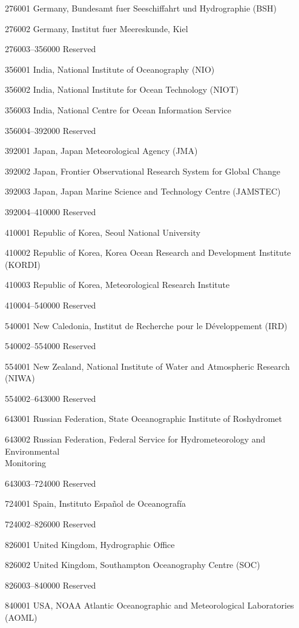 276001 Germany, Bundesamt fuer Seeschiffahrt und Hydrographie (BSH)

276002 Germany, Institut fuer Meereskunde, Kiel

276003--356000 Reserved

356001 India, National Institute of Oceanography (NIO)

356002 India, National Institute for Ocean Technology (NIOT)

356003 India, National Centre for Ocean Information Service

356004--392000 Reserved

392001 Japan, Japan Meteorological Agency (JMA)

392002 Japan, Frontier Observational Research System for Global Change

392003 Japan, Japan Marine Science and Technology Centre (JAMSTEC)

392004--410000 Reserved

410001 Republic of Korea, Seoul National University

410002 Republic of Korea, Korea Ocean Research and Development Institute (KORDI)

410003 Republic of Korea, Meteorological Research Institute

410004--540000 Reserved

540001 New Caledonia, Institut de Recherche pour le Développement (IRD)

540002--554000 Reserved

554001 New Zealand, National Institute of Water and Atmospheric Research (NIWA)

554002--643000 Reserved

643001 Russian Federation, State Oceanographic Institute of Roshydromet

643002 Russian Federation, Federal Service for Hydrometeorology and Environmental\\
Monitoring

643003--724000 Reserved

724001 Spain, Instituto Español de Oceanografía

724002--826000 Reserved

826001 United Kingdom, Hydrographic Office

826002 United Kingdom, Southampton Oceanography Centre (SOC)

826003--840000 Reserved

840001 USA, NOAA Atlantic Oceanographic and Meteorological Laboratories (AOML)

